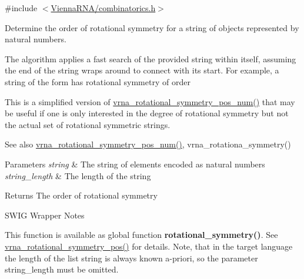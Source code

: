 {\ttfamily \#include $<$\hyperlink{combinatorics_8h}{Vienna\+R\+N\+A/combinatorics.\+h}$>$}



Determine the order of rotational symmetry for a string of objects represented by natural numbers. 

The algorithm applies a fast search of the provided string within itself, assuming the end of the string wraps around to connect with it\textquotesingle{}s start. For example, a string of the form {} has rotational symmetry of order {} 

This is a simplified version of \hyperlink{group__combinatorics__utils_ga95b5a6ac35da982e2a766f8d2f98a2e1}{vrna\+\_\+rotational\+\_\+symmetry\+\_\+pos\+\_\+num()} that may be useful if one is only interested in the degree of rotational symmetry but not the actual set of rotational symmetric strings.

\begin{DoxySeeAlso}{See also}
\hyperlink{group__combinatorics__utils_ga95b5a6ac35da982e2a766f8d2f98a2e1}{vrna\+\_\+rotational\+\_\+symmetry\+\_\+pos\+\_\+num()}, vrna\+\_\+rotationa\+\_\+symmetry()
\end{DoxySeeAlso}

\begin{DoxyParams}{Parameters}
{\em string} & The string of elements encoded as natural numbers \\
\hline
{\em string\+\_\+length} & The length of the string \\
\hline
\end{DoxyParams}
\begin{DoxyReturn}{Returns}
The order of rotational symmetry
\end{DoxyReturn}
\begin{DoxyRefDesc}{S\+W\+I\+G Wrapper Notes}
\item[\hyperlink{wrappers__wrappers000004}{S\+W\+I\+G Wrapper Notes}]This function is available as global function {\bfseries rotational\+\_\+symmetry()}. See \hyperlink{group__combinatorics__utils_ga294d48935fcac87ab335d771fe289ecb}{vrna\+\_\+rotational\+\_\+symmetry\+\_\+pos()} for details. Note, that in the target language the length of the list {\ttfamily string} is always known a-\/priori, so the parameter {\ttfamily string\+\_\+length} must be omitted. \end{DoxyRefDesc}
\mbox{\label{group__combinatorics__utils_ga95b5a6ac35da982e2a766f8d2f98a2e1}} 
